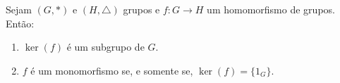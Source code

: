 \documentclass{beamer}
\begin{document}
    \begin{frame}
        \begin{proposicao}
            Sejam $(G, *)$ e $(H, \triangle)$ grupos e $f : G \to H$ um homomorfismo de grupos. Ent\~ao:
            \begin{enumerate}[label={\roman*})]
                \item $\ker(f)$ \'e um subgrupo de $G$.
                \item $f$ \'e um monomorfismo se, e somente se, $\ker(f) = \{1_G\}$.
            \end{enumerate}
        \end{proposicao}
    \end{frame}
\end{document}
